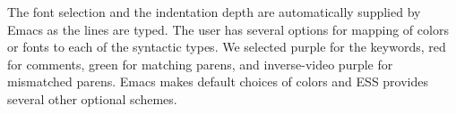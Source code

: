 \documentclass{article}
\newif\ifdraft
\newcommand{\stexttt}[1]{{\small\texttt{#1}}}
\newcommand{\emptyfig}{
\hspace*{42pt}\rule{324pt}{.25pt}\\
\hspace*{42pt}\rule{.25pt}{10pc}
\rule{316pt}{.25pt}
\rule{.25pt}{10pc}}
\begin{document}

The font selection and the indentation depth are automatically
supplied by Emacs as the lines are typed.  The user has several
options for mapping of colors or fonts to each of the syntactic types.
We selected
purple for the keywords, red for comments, green
for matching parens, and inverse-video purple for mismatched parens.
Emacs makes default choices of colors and ESS
provides several other optional schemes.




\end{document}
